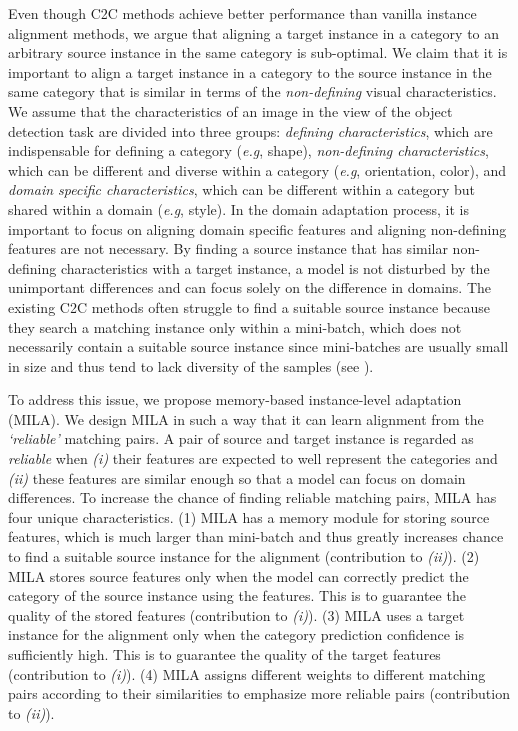 \documentclass{bmvc2k}
\def\eg{\emph{e.g}\bmvaOneDot}
\begin{document}
Even though C2C methods achieve better performance than vanilla instance alignment methods, we argue that aligning a target instance in a category to an arbitrary source instance in the same category is sub-optimal. 
We claim that it is important to align a target instance in a category to the source instance in the same category that is similar in terms of the {\it non-defining} visual characteristics.
We assume that the characteristics of an image in the view of the object detection task are divided into three groups: {\it defining characteristics}, which are indispensable for defining a category (\eg, shape), {\it non-defining characteristics}, which can be different and diverse within a category (\eg, orientation, color), and {\it domain specific characteristics}, which can be different within a category but shared within a domain (\eg, style).
In the domain adaptation process, it is important to focus on aligning domain specific features and aligning non-defining features are not necessary.
By finding a source instance that has similar non-defining characteristics with a target instance, a model is not disturbed by the unimportant differences and can focus solely on the difference in domains. 
The existing C2C methods often struggle to find a suitable source instance because they search a matching instance only within a mini-batch, which does not necessarily contain a suitable source instance since mini-batches are usually small in size and thus tend to lack diversity of the samples (see ).


To address this issue, we propose memory-based instance-level adaptation (MILA).
We design MILA in such a way that it can learn alignment from the {\it `reliable'} matching pairs.
A pair of source and target instance is regarded as {\it reliable} when {\it (i)} their features are expected to well represent the categories and {\it (ii)} these features are similar enough so that a model can focus on domain differences.
To increase the chance of finding reliable matching pairs, MILA has four unique characteristics. 
(1) MILA has a memory module for storing source features, which is much larger than mini-batch and thus greatly increases chance to find a suitable source instance for the alignment (contribution to {\it (ii)}).
(2) MILA stores source features only when the model can correctly predict the category of the source instance using the features.
This is to guarantee the quality of the stored features (contribution to {\it (i)}).
(3) MILA uses a target instance for the alignment only when the category prediction confidence is sufficiently high.
This is to guarantee the quality of the target features (contribution to {\it (i)}).
(4) MILA assigns different weights to different matching pairs according to their similarities to emphasize more reliable pairs (contribution to {\it (ii)}).
\end{document}
